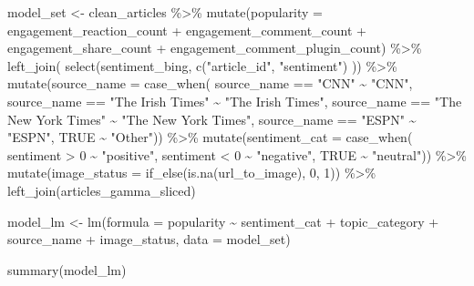 \documentclass[
]{article}
\newenvironment{Shaded}{\begin{snugshade}}{\end{snugshade}}
\newcommand{\AttributeTok}[1]{\textcolor[rgb]{0.77,0.63,0.00}{#1}}
\newcommand{\ConstantTok}[1]{\textcolor[rgb]{0.00,0.00,0.00}{#1}}
\newcommand{\DecValTok}[1]{\textcolor[rgb]{0.00,0.00,0.81}{#1}}
\newcommand{\FunctionTok}[1]{\textcolor[rgb]{0.00,0.00,0.00}{#1}}
\newcommand{\NormalTok}[1]{#1}
\newcommand{\OtherTok}[1]{\textcolor[rgb]{0.56,0.35,0.01}{#1}}
\newcommand{\SpecialCharTok}[1]{\textcolor[rgb]{0.00,0.00,0.00}{#1}}
\newcommand{\StringTok}[1]{\textcolor[rgb]{0.31,0.60,0.02}{#1}}
\begin{document}
\begin{Shaded}
\begin{Highlighting}[]
\NormalTok{model\_set }\OtherTok{\textless{}{-}}\NormalTok{ clean\_articles }\SpecialCharTok{\%\textgreater{}\%}
\FunctionTok{mutate}\NormalTok{(}\AttributeTok{popularity =}\NormalTok{ engagement\_reaction\_count }\SpecialCharTok{+}\NormalTok{ engagement\_comment\_count }\SpecialCharTok{+}\NormalTok{ engagement\_share\_count }\SpecialCharTok{+}\NormalTok{ engagement\_comment\_plugin\_count) }\SpecialCharTok{\%\textgreater{}\%}
\FunctionTok{left\_join}\NormalTok{(}
           \FunctionTok{select}\NormalTok{(sentiment\_bing, }\FunctionTok{c}\NormalTok{(}\StringTok{"article\_id"}\NormalTok{, }\StringTok{"sentiment"}\NormalTok{)}
\NormalTok{                                                              )) }\SpecialCharTok{\%\textgreater{}\%}
\FunctionTok{mutate}\NormalTok{(}\AttributeTok{source\_name =} \FunctionTok{case\_when}\NormalTok{(}
\NormalTok{    source\_name }\SpecialCharTok{==} \StringTok{"CNN"}                  \SpecialCharTok{\textasciitilde{}} \StringTok{"CNN"}\NormalTok{,}
\NormalTok{    source\_name }\SpecialCharTok{==} \StringTok{"The Irish Times"}      \SpecialCharTok{\textasciitilde{}} \StringTok{"The Irish Times"}\NormalTok{,}
\NormalTok{    source\_name }\SpecialCharTok{==} \StringTok{"The New York Times"}   \SpecialCharTok{\textasciitilde{}} \StringTok{"The New York Times"}\NormalTok{,}
\NormalTok{    source\_name }\SpecialCharTok{==} \StringTok{"ESPN"}                 \SpecialCharTok{\textasciitilde{}} \StringTok{"ESPN"}\NormalTok{,}
    \ConstantTok{TRUE}                                  \SpecialCharTok{\textasciitilde{}} \StringTok{"Other"}\NormalTok{)) }\SpecialCharTok{\%\textgreater{}\%}
  \FunctionTok{mutate}\NormalTok{(}\AttributeTok{sentiment\_cat =} \FunctionTok{case\_when}\NormalTok{(}
\NormalTok{    sentiment }\SpecialCharTok{\textgreater{}} \DecValTok{0}                  \SpecialCharTok{\textasciitilde{}} \StringTok{"positive"}\NormalTok{,}
\NormalTok{    sentiment }\SpecialCharTok{\textless{}} \DecValTok{0}                  \SpecialCharTok{\textasciitilde{}} \StringTok{"negative"}\NormalTok{,}
    \ConstantTok{TRUE}                           \SpecialCharTok{\textasciitilde{}} \StringTok{"neutral"}\NormalTok{)) }\SpecialCharTok{\%\textgreater{}\%}
\FunctionTok{mutate}\NormalTok{(}\AttributeTok{image\_status =} \FunctionTok{if\_else}\NormalTok{(}\FunctionTok{is.na}\NormalTok{(url\_to\_image), }\DecValTok{0}\NormalTok{, }\DecValTok{1}\NormalTok{)) }\SpecialCharTok{\%\textgreater{}\%}
\FunctionTok{left\_join}\NormalTok{(articles\_gamma\_sliced)}

\NormalTok{model\_lm }\OtherTok{\textless{}{-}} \FunctionTok{lm}\NormalTok{(}\AttributeTok{formula =}\NormalTok{ popularity }\SpecialCharTok{\textasciitilde{}}\NormalTok{ sentiment\_cat }\SpecialCharTok{+}\NormalTok{ topic\_category }\SpecialCharTok{+}\NormalTok{ source\_name }\SpecialCharTok{+}\NormalTok{ image\_status, }\AttributeTok{data =}\NormalTok{ model\_set)}
        
\FunctionTok{summary}\NormalTok{(model\_lm)}
\end{Highlighting}
\end{Shaded}
\end{document}
